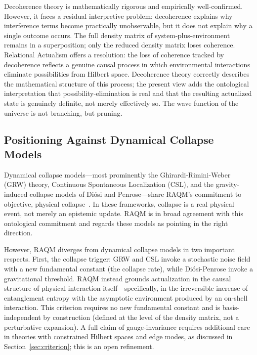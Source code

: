 \documentclass[11pt,a4paper]{article}
\theoremstyle{plain}
\theoremstyle{definition}
\theoremstyle{remark}
\begin{document}
Decoherence theory is mathematically rigorous and empirically well-confirmed.
However, it faces a residual interpretive problem: decoherence explains why
interference terms become practically unobservable, but it does not explain why a
single outcome occurs. The full density matrix of system-plus-environment remains
in a superposition; only the reduced density matrix loses coherence. Relational
Actualism offers a resolution: the loss of coherence tracked by decoherence
reflects a genuine causal process in which environmental interactions eliminate
possibilities from Hilbert space. Decoherence theory correctly describes the
mathematical structure of this process; the present view adds the ontological
interpretation that possibility-elimination is real and that the resulting
actualized state is genuinely definite, not merely effectively so. The wave
function of the universe is not branching, but pruning.

\subsection{Positioning Against Dynamical Collapse Models}
\label{sec:collapse}

Dynamical collapse models---most prominently the Ghirardi-Rimini-Weber (GRW)
theory, Continuous Spontaneous Localization (CSL), and the gravity-induced
collapse models of Di\'{o}si and Penrose---share RAQM's commitment to objective,
physical collapse~\citep{Bassi2013}. In these frameworks, collapse is a real
physical event, not merely an epistemic update. RAQM is in broad agreement with
this ontological commitment and regards these models as pointing in the right
direction.

However, RAQM diverges from dynamical collapse models in two important respects.
First, the collapse trigger: GRW and CSL invoke a stochastic noise field with a
new fundamental constant (the collapse rate), while Di\'{o}si-Penrose invoke a
gravitational threshold. RAQM instead grounds actualization in the causal
structure of physical interaction itself---specifically, in the irreversible
increase of entanglement entropy with the asymptotic environment produced by an
on-shell interaction. This criterion requires no new fundamental constant and is
basis-independent by construction (defined at the level of the density matrix, not
a perturbative expansion). A full claim of gauge-invariance requires additional
care in theories with constrained Hilbert spaces and edge modes, as discussed in
Section~\ref{sec:criterion}; this is an open refinement.
\end{document}
